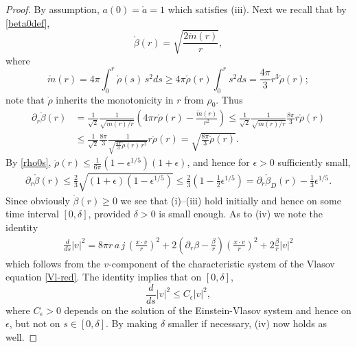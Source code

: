 \documentclass[11pt]{article}
\begin{document}
\begin{proof}
  By assumption, $a(0) = \mathring a = 1$ which satisfies (iii).
  Next we recall that by \eqref{beta0def},
  \[
  \mathring{\beta} (r)
  = \sqrt{\frac{2 \mathring m(r)}{r}},
  \]
  where
  \[
  \mathring m(r) = 4\pi \int_0^r \mathring \rho(s)\, s^2 ds
  \geq 4\pi \mathring\rho (r) \int_0^r s^2 ds
  = \frac{4\pi}{3} r^3 \mathring\rho (r);
  \]
  note that $\mathring\rho$ inherits the monotonicity in $r$ from
  $\rho_0$. Thus
  \begin{align*}
    \partial_r\mathring\beta(r)
    & =
    \frac{1}{\sqrt{2}}\frac{1}{\sqrt{\mathring m(r)/r}}
    \left(4\pi r \mathring\rho(r) - \frac{\mathring m(r)}{r^2}\right)
    \leq
    \frac{1}{\sqrt{2}}\frac{1}{\sqrt{\mathring m(r)/r}}\frac{8\pi}{3}
    r \mathring\rho(r)\\
    & \leq
    \frac{1}{\sqrt{2}} \frac{8\pi}{3}
    \frac{1}{\sqrt{\frac{4\pi}{3}\mathring \rho(r)\,r^2}} r \mathring\rho(r)
    =
    \sqrt{\frac{8\pi}{3} \mathring\rho(r)}.
  \end{align*}
  By \eqref{rho0s},
  $\mathring\rho (r) \leq
    \frac{1}{6\pi} (1-\epsilon^{1/5}) (1+\epsilon)$, and hence
  for $\epsilon>0$ sufficiently small,
  \begin{align}\label{initbetadiff}
    \partial_r\mathring\beta(r)
    \leq \frac{2}{3} \sqrt{(1+\epsilon)(1-\epsilon^{1/5})}
    \leq \frac{2}{3} \left(1-\frac{1}{2}\epsilon^{1/5}\right)
    = \partial_r\mathring\beta_D(r) - \frac{1}{3}\epsilon^{1/5}.
  \end{align}
  Since obviously $\mathring\beta(r)\geq 0$ we see that (i)--(iii) hold
  initially and hence on some time interval $[0,\delta]$, provided
  $\delta>0$ is small enough. As to (iv) we note the identity
  \begin{align}\label{vsquaredot}
    \frac{d}{ds} |v|^2 =
    8 \pi r \,a\, j\, \left(\frac{x\cdot v}{r}\right)^2
    + 2 \left(\partial_r\beta-\frac{\beta}{r}\right)
    \left(\frac{x\cdot v}{r}\right)^2
    + 2 \frac{\beta}{r} |v|^2
  \end{align}
  which follows from the $v$-component of the characteristic system of the
  Vlasov equation \eqref{Vl-red}. The identity implies that on $[0,\delta]$,
  \[
  \frac{d}{ds} |v|^2 \leq C_\epsilon |v|^2,
  \]
  where $C_\epsilon>0$ depends on the solution of the Einstein-Vlasov
  system and hence on $\epsilon$, but not on $s\in [0,\delta]$. By making
  $\delta$ smaller if necessary, (iv) now holds as well.
\end{proof}
%
%
\end{document}
